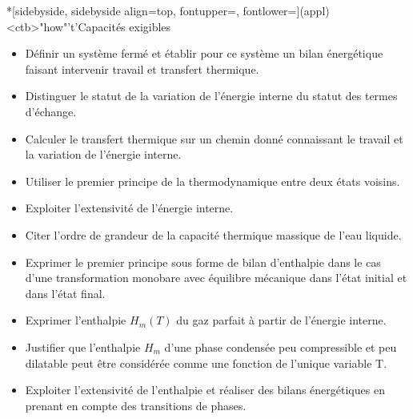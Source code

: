 \documentclass[../../main/main.tex]{subfiles}
\begin{document}
\begin{tcn}*[sidebyside, sidebyside align=top,
		fontupper=\small, fontlower=\small](appl)<ctb>"how"'t'{Capacités exigibles}
	\begin{itemize}[label=\rcheck]
		\item Définir un système fermé et établir pour ce système un bilan
		      énergétique faisant intervenir travail et transfert thermique.

		\item Distinguer le statut de la variation de l'énergie interne du statut des
		      termes d'échange.

		\item Calculer le transfert thermique sur un chemin donné connaissant le
		      travail et la variation de l'énergie interne.

		\item Utiliser le premier principe de la thermodynamique entre deux états
		      voisins.

		\item Exploiter l'extensivité de l'énergie interne.

		\item Citer l'ordre de grandeur de la capacité thermique massique de l'eau
		      liquide.
	\end{itemize}
	\tcblower
	\begin{itemize}[label=\rcheck]

		\item Exprimer le premier principe sous forme de bilan d'enthalpie dans le cas
		      d'une transformation monobare avec équilibre mécanique dans l'état initial
		      et dans l'état final.

		\item Exprimer l'enthalpie $H_m(T)$ du gaz parfait à partir de l'énergie
		      interne.

		\item Justifier que l'enthalpie $H_m$ d'une phase condensée peu compressible
		      et peu dilatable peut être considérée comme une fonction de l'unique
		      variable T.

		\item Exploiter l'extensivité de l'enthalpie et réaliser des bilans
		      énergétiques en prenant en compte des transitions de phases.
	\end{itemize}
\end{tcn}

\vspace*{\fill}
\end{document}

